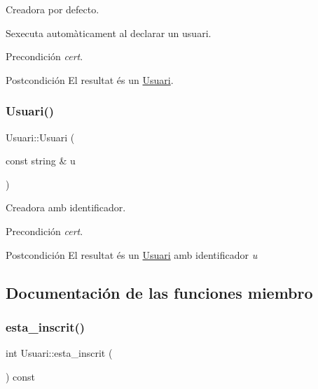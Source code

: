 Creadora por defecto. 

S\textquotesingle{}executa automàticament al declarar un usuari. \begin{DoxyPrecond}{Precondición}
{\itshape cert}. 
\end{DoxyPrecond}
\begin{DoxyPostcond}{Postcondición}
El resultat és un \mbox{\hyperlink{class_usuari}{Usuari}}. 
\end{DoxyPostcond}
\mbox{\label{class_usuari_a7f5c33ccd547e24683f5d868700574d6}} 
\subsubsection{\texorpdfstring{Usuari()}{Usuari()}\hspace{0.1cm}{\footnotesize\ttfamily [2/2]}}
{\footnotesize\ttfamily Usuari\+::\+Usuari (\begin{DoxyParamCaption}\item[{const string \&}]{u }\end{DoxyParamCaption})}



Creadora amb identificador. 

\begin{DoxyPrecond}{Precondición}
{\itshape cert}. 
\end{DoxyPrecond}
\begin{DoxyPostcond}{Postcondición}
El resultat és un \mbox{\hyperlink{class_usuari}{Usuari}} amb identificador {\itshape u{\itshape  }}
\end{DoxyPostcond}


\subsection{Documentación de las funciones miembro}
\mbox{\label{class_usuari_a0d20c2d77d8231d9a7e3e00a42a7e7c8}} 
\subsubsection{\texorpdfstring{esta\+\_\+inscrit()}{esta\_inscrit()}}
{\footnotesize\ttfamily int Usuari\+::esta\+\_\+inscrit (\begin{DoxyParamCaption}{ }\end{DoxyParamCaption}) const}



